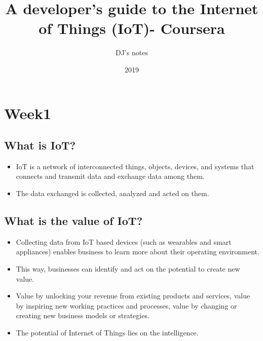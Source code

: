\documentclass[11pt, twoside]{article}   	%
\title{A developer's guide to the Internet of Things \big(IoT\big)- Coursera}
\author{DJ's notes}
\date{2019}%
\begin{document}
\maketitle %
\tableofcontents %

\pagebreak
\section{Week1}
\subsection{What is IoT?}
\begin{itemize}
\item IoT is a network of interconnected things, objects, devices, and systems that connects and transmit data and exchange data among them.
\item The data exchanged is collected, analyzed and acted on them. 
\end {itemize}
\subsection{What is the value of IoT?}
\begin{itemize}
\item Collecting  data from IoT based devices (such as wearables and smart appliances) enables business to learn more about their operating environment. 
\item This way, businesses can identify and act on the potential to create new value. 
\item Value by unlocking your revenue from existing products and services, value by inspiring new working practices and processes, value by changing or creating new business models or strategies.
\item The potential of Internet of Things lies on the intelligence.
\end {itemize}
\end{document}
